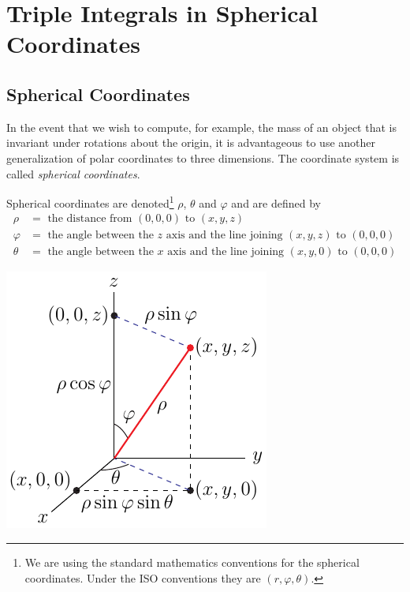 \section{Triple Integrals in Spherical Coordinates} \label{sec spherical}

\subsection{Spherical Coordinates} \label{sec spherical coords}

In the event that we wish to compute, for example, the mass
of an object that is invariant under rotations about the origin,
it is advantageous to use another generalization of polar coordinates
to three dimensions. The coordinate system is called \emph{spherical
coordinates}. 
\begin{defn}\label{def spherical}
Spherical coordinates are denoted\footnote{We are using the 
standard mathematics conventions for the spherical coordinates.
Under the ISO conventions they are $(r,\varphi,\theta)$.} 
$\rho$, $\theta$ and $\varphi$ and are defined by
\begin{align*}
\rho&=\text{ the distance from }(0,0,0)\text{ to }(x,y,z)\\
\varphi&=\text{ the angle between the $z$ axis and the line joining $(x,y,z)$ to $(0,0,0)$} \\
\theta&=\text{ the angle between the $x$ axis and the line joining $(x,y,0)$ to $(0,0,0)$}
\end{align*}
\begin{efig}
\begin{center}
    \includegraphics{figures/coord/spherical.pdf}
\end{center}
\end{efig}
\end{defn}
